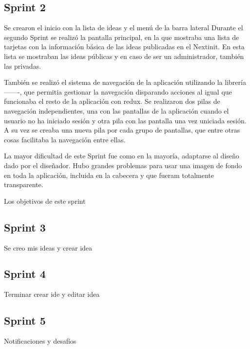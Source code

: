 \subsection{Sprint 2}

Se crearon el inicio con la lista de ideas y el menú de la barra lateral
Durante el segundo Sprint se realizó la pantalla principal, en la que mostraba una lista de tarjetas con la 
información básica de las ideas publicadas en el Nextinit. En esta lista se mostraban las ideas públicas y 
en caso de ser un administrador, también las privadas.

También se realizó el sistema de navegación de la aplicación utilizando la librería -------, que permitia gestionar 
la navegación disparando acciones al igual que funcionaba el resto de la aplicación con redux. Se realizaron dos 
pilas de navegación independientes, una con las pantallas de la aplicación cuando el usuario no ha iniciado 
sesión y otra pila con las pantalla una vez uniciada sesión. A su vez se creaba una nueva pila por cada grupo de pantallas,
que entre otras cosas facilitaba la navegación entre ellas.

La mayor dificultad de este Sprint fue como en la mayoría, adaptarse al diseño dado por el diseñador. Hubo grandes problemas
para usar una imagen de fondo en toda la aplicación, incluida en la cabecera y que fueram totalmente transparente.

Los objetivos de este sprint

\subsection{Sprint 3}

Se creo mis ideas y crear idea

\subsection{Sprint 4}

Terminar crear ide y editar idea

\subsection{Sprint 5}

Notificaciones y desafíos

